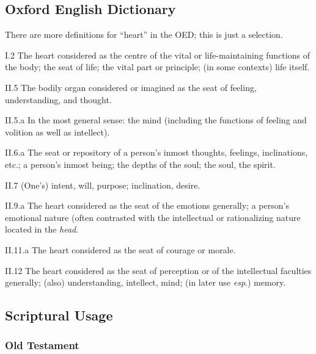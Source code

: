 \subsection{Oxford English Dictionary} %
	\label{HEART-OED}
	
	There are more definitions for ``heart'' in the OED; this is just a selection.

	\begin{compactitem}
		\item[I.2] The heart considered as the centre of the vital or life-maintaining functions of the body; the seat of life; the vital part or principle; (in some contexts) life itself.
		\item[II.5] The bodily organ considered or imagined as the seat of feeling, understanding, and thought.
		\item[II.5.a] In the most general sense: the mind (including the functions of feeling and volition as well as intellect).
		\item[II.6.a] The seat or repository of a person's inmost thoughts, feelings, inclinations, etc.; a person's inmost being; the depths of the soul; the soul, the spirit.
		\item[II.7] (One's) intent, will, purpose; inclination, desire.
		\item[II.9.a] The heart considered as the seat of the emotions generally; a person's emotional nature (often contrasted with the intellectual or rationalizing nature located in the \textit{head}.
		\item[II.11.a] The heart considered as the seat of courage or morale.
		\item[II.12] The heart considered as the seat of perception or of the intellectual faculties generally; (also) understanding, intellect, mind; (in later use \textit{esp}.) memory.
	\end{compactitem}

\subsection{Scriptural Usage} %
	\label{HEART-SCRIPTURES}

	\subsubsection{Old Testament} %
		\label{HEART-OT}
	
